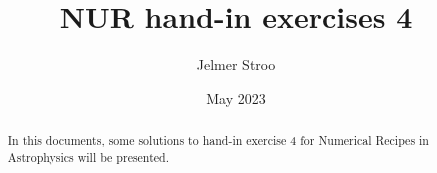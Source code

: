 \documentclass{article}
\title{NUR hand-in exercises 4}
\author{Jelmer Stroo}
\date{May 2023}
\begin{document}
\maketitle

\begin{abstract}
    In this documents, some solutions to hand-in exercise 4 for Numerical Recipes in Astrophysics will be presented.
\end{abstract}


\end{document}
